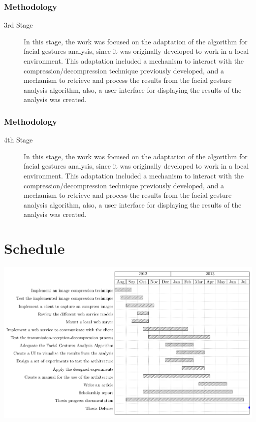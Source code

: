 \documentclass[compress]{beamer}
\begin{document}
\begin{frame}
	\frametitle{Methodology}
	\begin{description}
\item[3rd Stage] In this stage, the work was focused on the adaptation of the algorithm for facial gestures analysis, since it was originally developed to work in a local environment. This adaptation included a mechanism to interact with the compression/decompression technique previously developed, and a mechanism to retrieve and process the results from the facial gesture analysis algorithm, also, a user interface for displaying the results of the analysis was created.
\end{description}
\end{frame}

\begin{frame}
	\frametitle{Methodology}
	\begin{description}
\item[4th Stage] In this stage, the work was focused on the adaptation of the algorithm for facial gestures analysis, since it was originally developed to work in a local environment. This adaptation included a mechanism to interact with the compression/decompression technique previously developed, and a mechanism to retrieve and process the results from the facial gesture analysis algorithm, also, a user interface for displaying the results of the analysis was created.
\end{description}
\end{frame}

\section{Schedule}
\begin{frame}
	\includegraphics[scale=0.30]{img/schedule.png}
\end{frame}
\end{document}
